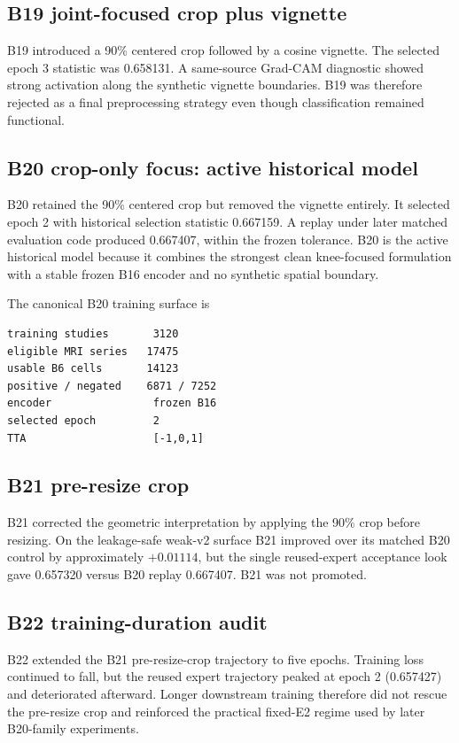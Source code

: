 \documentclass[preprint,12pt]{elsarticle}
\begin{document}
\subsection{B19 joint-focused crop plus vignette}
B19 introduced a 90\% centered crop followed by a cosine vignette. The selected epoch 3 statistic was 0.658131. A same-source Grad-CAM diagnostic showed strong activation along the synthetic vignette boundaries. B19 was therefore rejected as a final preprocessing strategy even though classification remained functional.

\subsection{B20 crop-only focus: active historical model}
B20 retained the 90\% centered crop but removed the vignette entirely. It selected epoch 2 with historical selection statistic 0.667159. A replay under later matched evaluation code produced 0.667407, within the frozen tolerance. B20 is the active historical model because it combines the strongest clean knee-focused formulation with a stable frozen B16 encoder and no synthetic spatial boundary.

The canonical B20 training surface is
\begin{verbatim}
training studies       3120
eligible MRI series   17475
usable B6 cells       14123
positive / negated    6871 / 7252
encoder                frozen B16
selected epoch         2
TTA                    [-1,0,1]
\end{verbatim}

\subsection{B21 pre-resize crop}
B21 corrected the geometric interpretation by applying the 90\% crop before resizing. On the leakage-safe weak-v2 surface B21 improved over its matched B20 control by approximately $+0.01114$, but the single reused-expert acceptance look gave 0.657320 versus B20 replay 0.667407. B21 was not promoted.

\subsection{B22 training-duration audit}
B22 extended the B21 pre-resize-crop trajectory to five epochs. Training loss continued to fall, but the reused expert trajectory peaked at epoch 2 (0.657427) and deteriorated afterward. Longer downstream training therefore did not rescue the pre-resize crop and reinforced the practical fixed-E2 regime used by later B20-family experiments.
\end{document}
